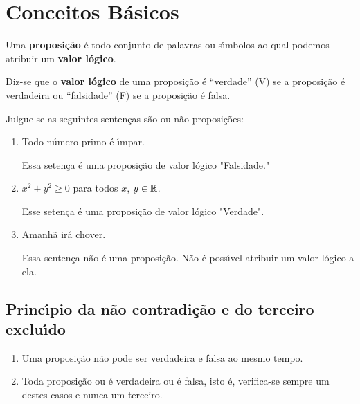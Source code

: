 \chapter{Conceitos B\'asicos} %
\label{cha:conceitos_basicos}

\begin{definicao}
	Uma \textbf{proposi\c{c}\~ao} \'e todo conjunto de palavras ou s{\'\i}mbolos ao qual podemos atribuir um \textbf{valor l\'ogico}.
\end{definicao}

\begin{definicao}
	Diz-se que o \textbf{valor l\'ogico} de uma proposi\c{c}\~ao \'e ``verdade'' (V) se a proposi\c{c}\~ao \'e verdadeira ou ``falsidade'' (F) se a proposi\c{c}\~ao \'e falsa.
\end{definicao}

\begin{exemplos}
	Julgue se as seguintes senten\c{c}as s\~ao ou n\~ao proposi\c{c}\~oes:
	\begin{enumerate}[label={\arabic*})]
		\item Todo n\'umero primo \'e {\'\i}mpar.
		\begin{solucao}
			Essa seten\c{c}a \'e uma proposi\c{c}\~ao de valor l\'ogico "Falsidade."
		\end{solucao}

		\item $x^2 + y^2 \ge 0$ para todos $x$, $y \in \mathbb{R}$.
		\begin{solucao}
			Esse seten\c{c}a \'e uma proposi\c{c}\~ao de valor l\'ogico "Verdade".
		\end{solucao}

		\item Amanh\~a ir\'a chover.
		\begin{solucao}
			Essa senten\c{c}a n\~ao \'e uma proposi\c{c}\~ao. N\~ao \'e poss{\'\i}vel atribuir um valor l\'ogico a ela.
		\end{solucao}
	\end{enumerate}

\end{exemplos}

\section{Princ{\'\i}pio da n\~ao contradi\c{c}\~ao e do terceiro exclu{\'\i}do} %
\label{sec:principio_da_nao_contradicao_e_do_3}
\begin{enumerate}[label={\roman*})]
	\item Uma proposi\c{c}\~ao n\~ao pode ser verdadeira e falsa ao mesmo tempo.
	\item Toda proposi\c{c}\~ao ou \'e verdadeira ou \'e falsa, isto \'e, verifica-se sempre um destes casos e nunca um terceiro.
\end{enumerate}

